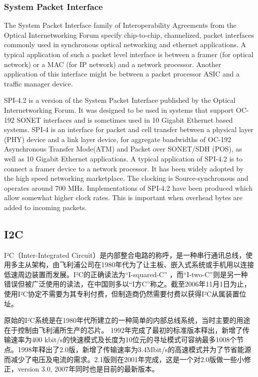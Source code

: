 \subsubsection{System Packet Interface}
The System Packet Interface family of Interoperability Agreements from the Optical Internetworking Forum specify chip-to-chip, channelized, packet interfaces commonly used in synchronous optical networking and ethernet applications. A typical application of such a packet level interface is between a framer (for optical network) or a MAC (for IP network) and a network processor. Another application of this interface might be between a packet processor ASIC and a traffic manager device.

SPI-4.2 is a version of the System Packet Interface published by the Optical Internetworking Forum. It was designed to be used in systems that support OC-192 SONET interfaces and is sometimes used in 10 Gigabit Ethernet based systems.
SPI-4 is an interface for packet and cell transfer between a physical layer (PHY) device and a link layer device, for aggregate bandwidths of OC-192 Asynchronous Transfer Mode(ATM) and Packet over SONET/SDH (POS), as well as 10 Gigabit Ethernet applications.
A typical application of SPI-4.2 is to connect a framer device to a network processor. It has been widely adopted by the high speed networking marketplace.
The clocking is Source-synchronous and operates around 700 MHz. Implementations of SPI-4.2 have been produced which allow somewhat higher clock rates. This is important when overhead bytes are added to incoming packets.




\subsection{I2C}
I²C（Inter-Integrated Circuit）是内部整合电路的称呼，是一种串行通讯总线，使用多主从架构，由飞利浦公司在1980年代为了让主板、嵌入式系统或手机用以连接低速周边装置而发展。I²C的正确读法为``I-squared-C'' ，而``I-two-C''则是另一种错误但被广泛使用的读法，在中国则多以``I方C''称之。截至2006年11月1日为止，使用I²C协定不需要为其专利付费，但制造商仍然需要付费以获得I²C从属装置位址。


原始的I²C系统是在1980年代所建立的一种简单的内部总线系统，当时主要的用途在于控制由飞利浦所生产的芯片。
1992年完成了最初的标准版本释出，新增了传输速率为400 kbit/s的快速模式及长度为10位元的寻址模式可容纳最多1008个节点。1998年释出了2.0版，新增了传输速率为3.4Mbit/s的高速模式并为了节省能源而减少了电压及电流的需求。2.1版则在2001年完成，这是一个对2.0版做一些小修正，version 3.0, 2007年同时也是目前的最新版本。

